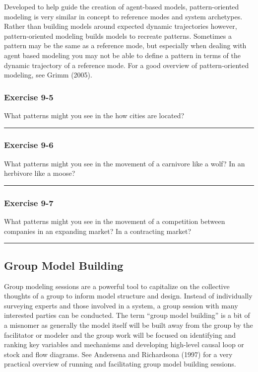 \documentclass[]{memoir}
\begin{document}
Developed to help guide the creation of agent-based models,
pattern-oriented modeling is very similar in concept to reference modes
and system archetypes. Rather than building models around expected
dynamic trajectories however, pattern-oriented modeling builds models to
recreate patterns. Sometimes a pattern may be the same as a reference
mode, but especially when dealing with agent based modeling you may not
be able to define a pattern in terms of the dynamic trajectory of a
reference mode. For a good overview of pattern-oriented modeling, see
Grimm (2005).

\subsubsection{Exercise 9-5}

What patterns might you see in the how cities are located?

\begin{center}\rule{3in}{0.4pt}\end{center}

\subsubsection{Exercise 9-6}

What patterns might you see in the movement of a carnivore like a wolf?
In an herbivore like a moose?

\begin{center}\rule{3in}{0.4pt}\end{center}

\subsubsection{Exercise 9-7}

What patterns might you see in the movement of a competition between
companies in an expanding market? In a contracting market?

\begin{center}\rule{3in}{0.4pt}\end{center}

\subsection{Group Model Building}

Group modeling sessions are a powerful tool to capitalize on the
collective thoughts of a group to inform model structure and design.
Instead of individually surveying experts and those involved in a
system, a group session with many interested parties can be conducted.
The term ``group model building'' is a bit of a misnomer as generally
the model itself will be built away from the group by the facilitator or
modeler and the group work will be focused on identifying and ranking
key variables and mechanisms and developing high-level causal loop or
stock and flow diagrams. See Andersena and Richardsona (1997) for a very
practical overview of running and facilitating group model building
sessions.
\end{document}
